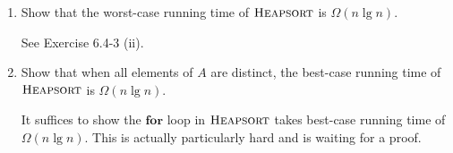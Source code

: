 \documentclass[12pt,reqno]{amsart}
\newif\ifanswer
\begin{document}
\begin{enumerate}[1.]
\item Show that the worst-case running time of $\textsc{Heapsort}$ is $\Omega(n\lg{n})$.

\ifanswer
{}
See Exercise 6.4-3 (ii).
\vspace{1cm}



\item Show that when all elements of $A$ are distinct, the best-case running time of $\textsc{Heapsort}$ is $\Omega(n\lg{n})$.

\ifanswer
{}
It suffices to show the $\textbf{for}$ loop in $\textsc{Heapsort}$ takes best-case running time of $\Omega(n\lg{n})$. This is actually particularly hard and is waiting for a proof.
\vspace{1cm}

\end{enumerate}
\end{document}
